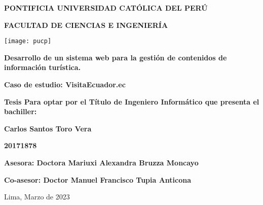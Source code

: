 

\begin{titlepage}
    \begin{center}
        \vspace*{1cm}
        \Large
        \textbf{PONTIFICIA UNIVERSIDAD CATÓLICA DEL PERÚ}

        \vspace{0.5cm}
        \textbf{FACULTAD DE CIENCIAS E INGENIERÍA}

        \vspace{0.5cm}
        \texttt{[image: pucp]}

        \vspace{1.5cm}
        \textbf{Desarrollo de un sistema web para la gestión de contenidos de información turística.}

        \textbf{Caso de estudio: VisitaEcuador.ec}

        \normalsize
        \vspace{3.5cm}
        \textbf{Tesis Para optar por el Título de Ingeniero Informático que presenta el bachiller:}

        \Large
        \vspace{1.5cm}
        \textbf{Carlos Santos Toro Vera}

        \vspace{0.3cm}
        \textbf{20171878}

        \vspace{2.5cm}
        \textbf{Asesora: Doctora Mariuxi Alexandra Bruzza Moncayo}

        \textbf{Co-asesor: Doctor Manuel Francisco Tupia Anticona}

        \normalsize
        \vspace{2.5cm}
        Lima, Marzo de 2023
    \end{center}
\end{titlepage}

